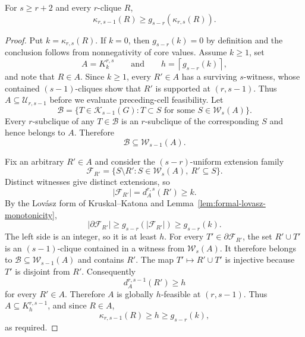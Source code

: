 \begin{theorem}
\label{thm:formal-shadow-transfer}
For $s\geq r+2$ and every $r$-clique $R$,
\[
\kappa_{r,s-1}(R)\geq g_{s-r}\!\left(\kappa_{r,s}(R)\right).
\]
\end{theorem}
\begin{proof}
Put $k=\kappa_{r,s}(R)$.
%
If $k=0$, then $g_{s-r}(k)=0$ by definition and the conclusion follows from nonnegativity of core values.
%
Assume $k\geq1$, set
\[
A=K_k^{r,s}
\qquad\text{and}\qquad
h=\left\lceil g_{s-r}(k)\right\rceil,
\]
and note that $R\in A$.
%
Since $k\geq1$, every $R'\in A$ has a surviving $s$-witness, whose contained $(s-1)$-cliques show that $R'$ is supported at $(r,s-1)$.
%
Thus $A\subseteq\mathcal U_{r,s-1}$ before we evaluate preceding-cell feasibility.
%
Let
\[
\mathcal B=\{T\in\mathcal K_{s-1}(G):T\subset S
\text{ for some }S\in\mathcal W_s(A)\}.
\]
Every $r$-subclique of any $T\in\mathcal B$ is an $r$-subclique of the corresponding $S$ and hence belongs to $A$.
%
Therefore
\[
\mathcal B\subseteq\mathcal W_{s-1}(A).
\]

Fix an arbitrary $R'\in A$ and consider the $(s-r)$-uniform extension family
\[
\mathcal F_{R'}=\{S\setminus R':S\in\mathcal W_s(A),\ R'\subseteq S\}.
\]
Distinct witnesses give distinct extensions, so
\[
|\mathcal F_{R'}|=d_A^{r,s}(R')\geq k.
\]
By the Lov\'{a}sz form of Kruskal--Katona and Lemma~\ref{lem:formal-lovasz-monotonicity},
\[
|\partial\mathcal F_{R'}|
\geq g_{s-r}(|\mathcal F_{R'}|)
\geq g_{s-r}(k).
\]
The left side is an integer, so it is at least $h$.
%
For every $T'\in\partial\mathcal F_{R'}$, the set $R'\cup T'$ is an $(s-1)$-clique contained in a witness from $\mathcal W_s(A)$.
%
It therefore belongs to $\mathcal B\subseteq\mathcal W_{s-1}(A)$ and contains $R'$.
%
The map $T'\mapsto R'\cup T'$ is injective because $T'$ is disjoint from $R'$.
%
Consequently
\[
d_A^{r,s-1}(R')\geq h
\]
for every $R'\in A$.
%
Therefore $A$ is globally $h$-feasible at $(r,s-1)$.
%
Thus $A\subseteq K_h^{r,s-1}$, and since $R\in A$,
\[
\kappa_{r,s-1}(R)\geq h\geq g_{s-r}(k),
\]
as required.
\end{proof}

